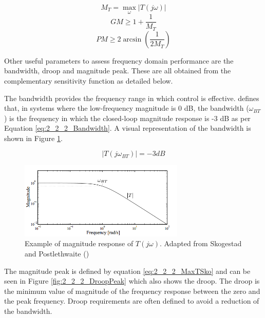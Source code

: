\begin{equation}
\label{eq:2_2_2_MaxTSko}
M_T = \max_{\omega} |T(j\omega)|
\end{equation}
\begin{equation}
\label{eq:2_2_2_GainMarginSko}
GM \geq 1 + \frac{1}{M_T}
\end{equation}
\begin{equation}
\label{eq:2_2_2_PhaseMarginSko}
PM \geq 2 \arcsin \left(\frac{1}{2M_T}\right)
\end{equation}

Other useful parameters to assess frequency domain performance are the bandwidth, droop and magnitude peak. These are all obtained from the complementary sensitivity function as detailed below.

The bandwidth provides the frequency range in which control is effective.  defines that, in systems where the low-frequency magnitude is 0 dB, the bandwidth ($\omega_{BT}$) is the frequency in which the closed-loop magnitude response is -3 dB as per Equation \ref{eq:2_2_2_Bandwidth}. A visual representation of the bandwidth is shown in Figure \ref{fig:2_2_2_Bandwidth}.

\begin{equation}
\label{eq:2_2_2_Bandwidth}
|T(j\omega_{BT})|=-3 dB
\end{equation}

\begin{figure}[H]
	\centering
	\centerline{\includegraphics[width=0.7\textwidth]{Figuras/2.TheoryBackground/bandwidth.png}}
	\caption{Example of magnitude response of $T(j\omega)$. Adapted from Skogestad and Postlethwaite (\citeyear{Skogestad})}
	\label{fig:2_2_2_Bandwidth}
\end{figure}

The magnitude peak is defined by equation \ref{eq:2_2_2_MaxTSko} and can be seen in Figure \ref{fig:2_2_2_DroopPeak} which also shows the droop. The droop is the minimum value of magnitude of the frequency response between the zero and the peak frequency. Droop requirements are often defined to avoid a reduction of the bandwidth.

